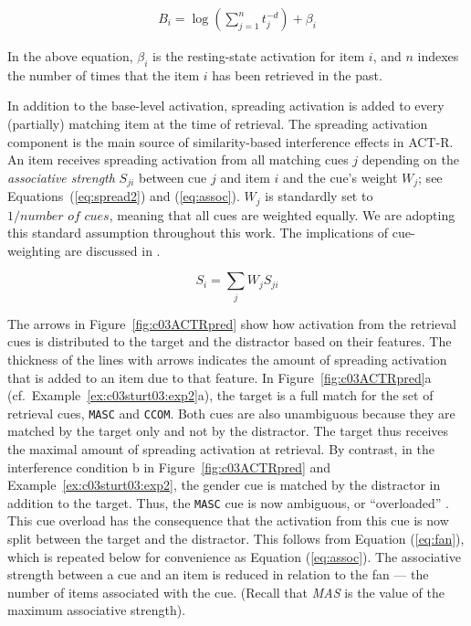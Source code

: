 \documentclass{cambridge7A}\usepackage[]{graphicx}\usepackage[]{color}
\newcommand{\actrcue}[1]{\texttt{\uppercase{#1}}}
\begin{document}
\begin{eqnarray}
  B_i = \log\left(\sum_{j=1}^n t_j^{-d}\right) + \beta_i \label{eq:bl}
\end{eqnarray}

\noindent
In the above equation, $\beta_i$ is the resting-state activation for item $i$, and $n$ indexes the number of times that the item $i$ has been retrieved in the past.

In addition to the base-level activation,  spreading activation is added to every (partially) matching item at the time of retrieval. The spreading activation component is the main source of similarity-based interference effects in ACT-R. 
An item receives spreading activation from all matching cues $j$ depending on the  \emph{associative strength} $S_{ji}$ between cue $j$ and item $i$ and the cue's weight $W_{j}$; see Equations~(\ref{eq:spread2}) and (\ref{eq:assoc}). $W_j$ is standardly set to $1/\textit{number of cues}$, meaning that all cues are weighted equally. We are adopting this standard assumption throughout this work.  The implications of cue-weighting are discussed in \citep{VasishthEtAlTiCS2019,JaegerMertzenVanDykeVasishth2019,YadavEtAlAMLaP2020}. 

\begin{equation}
      S_i = \sum_j W_{j} S_{ji} \label{eq:spread2}
\end{equation}

The arrows in Figure~\ref{fig:c03ACTRpred} show how activation from the retrieval cues is distributed to the target and the distractor based on their features. The thickness of the lines with arrows indicates the amount of spreading activation that is added to an item due to that feature.
In Figure~\ref{fig:c03ACTRpred}a (cf.\ Example~\ref{ex:c03sturt03:exp2}a), the target is a full match for the set of retrieval cues, \actrcue{masc} and \actrcue{ccom}. Both cues are also unambiguous because they are matched by the target only and not by the distractor. The target thus receives the maximal amount of spreading activation at retrieval. By contrast, 
in the interference condition b in Figure~\ref{fig:c03ACTRpred} and Example~\ref{ex:c03sturt03:exp2}, the gender cue is matched by the distractor in addition to the target. Thus, the \actrcue{MASC} cue is now ambiguous, or ``overloaded'' \citep{WatkinsWatkins1975}. This  cue overload has the consequence that the activation from this cue is now split between the target and the distractor. 
This follows from Equation (\ref{eq:fan}), which is repeated below for convenience as Equation (\ref{eq:assoc}). The associative strength between a cue and an item is reduced in relation to the fan --- the number of items associated with the cue. (Recall that \textit{MAS} is the value of the maximum associative strength).
\end{document}
